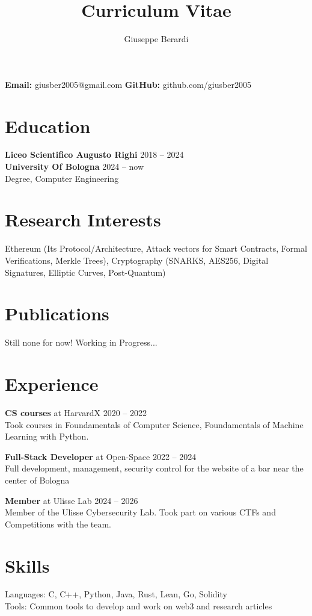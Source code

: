 \documentclass{article}
\title{Curriculum Vitae}
\author{Giuseppe Berardi}
\begin{document}
\maketitle

\noindent\textbf{Email:} giusber2005@gmail.com \quad
\textbf{GitHub:} github.com/giusber2005

\section*{Education}

\textbf{Liceo Scientifico Augusto Righi} \hfill 2018 -- 2024 \\

\textbf{University Of Bologna} \hfill 2024 -- now \\
Degree, Computer Engineering \\

\section*{Research Interests}

Ethereum (Its Protocol/Architecture, Attack vectors for Smart Contracts, Formal Verifications, Merkle Trees), Cryptography (SNARKS, AES256, Digital Signatures, Elliptic Curves, Post-Quantum) 

\section*{Publications}

Still none for now! Working in Progress...

\section*{Experience}

\textbf{CS courses} at HarvardX \hfill 2020 -- 2022 \\ 
Took courses in Foundamentals of Computer Science, Foundamentals of Machine Learning with Python.

\textbf{Full-Stack Developer} at Open-Space \hfill 2022 -- 2024 \\
Full development, management, security control for the website of a bar near the center of Bologna

\textbf{Member} at Ulisse Lab \hfill 2024 -- 2026 \\
Member of the Ulisse Cybersecurity Lab. Took part on various CTFs and Competitions with the team.

\section*{Skills}

Languages: C, C++, Python, Java, Rust, Lean, Go, Solidity \\
Tools: Common tools to develop and work on web3 and research articles
\end{document}
